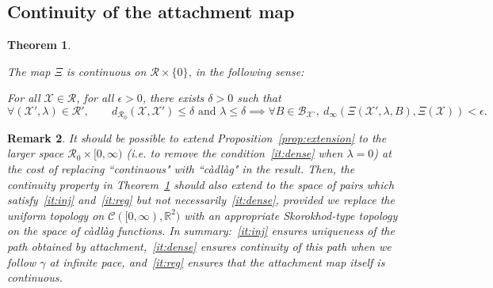 \documentclass[11pt]{article}
\newtheorem{theorem}{Theorem}[section]
\newtheorem{remark}[theorem]{Remark}
\def\Conf{{\mathscr{R}}}
\def\Att{{\Xi}}
\begin{document}
\subsection{Continuity of the attachment map}
\label{sub:cont2}
\begin{theorem}
\label{th:continuityAtt}

	The map $\Att$ is continuous on $\Conf\times\{0\}$, in the following sense:

  For all $\mathcal{X}\in \Conf$, for all $\epsilon>0$, there exists $\delta>0$ such that
  \[
  \forall (\mathcal{X}',\lambda)\in \Conf', \qquad d_{\mathcal{R}_0}(\mathcal{X},\mathcal{X}')\leq \delta \mbox{ and }\lambda\leq \delta\implies \forall B\in \mathcal{B}_{\mathcal{X}'} , \ d_\infty(\Att(\mathcal{X}',\lambda, B) ,\Att(\mathcal{X})   )<\epsilon.
  \]
\end{theorem}
\begin{remark}
  It should be possible to extend Proposition~\ref{prop:extension} to the larger space $\Conf_0\times [0,\infty)$ (i.e. to remove the condition~\eqref{it:dense} when $\lambda=0$) at the cost of replacing ``continuous" with ``càdlàg" in the result. Then, the continuity property in Theorem~\ref{th:continuityAtt} should also extend to the space of pairs which satisfy~\eqref{it:inj} and~\eqref{it:reg} but not necessarily~\eqref{it:dense}, provided we replace the uniform topology on $\mathcal{C}([0,\infty),\mathbb{R}^2)$
  with an appropriate Skorokhod-type topology on the space of càdlàg functions. In summary:~\eqref{it:inj} ensures uniqueness of the path obtained by attachment,~\eqref{it:dense} ensures continuity of this path when we follow $\gamma$ at infinite pace, and~\eqref{it:reg} ensures that the attachment map itself is continuous.


\end{remark}
\end{document}
